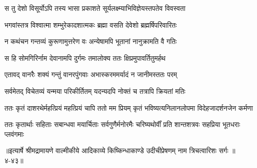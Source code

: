 \twolineshloka
{स तु देशो विसूर्योऽपि तस्य भासा प्रकाशते}
{सूर्यलक्ष्म्याभिविज्ञेयस्तपतेव विवस्वता} %

\twolineshloka
{भगवांस्तत्र विश्वात्मा शम्भुरेकादशात्मकः}
{ब्रह्मा वसति देवेशो ब्रह्मर्षिपरिवारितः} %

\twolineshloka
{न कथंचन गन्तव्यं कुरूणामुत्तरेण वः}
{अन्येषामपि भूतानां नानुक्रामति वै गतिः} %

\twolineshloka
{स हि सोमगिरिर्नाम देवानामपि दुर्गमः}
{तमालोक्य ततः क्षिप्रमुपावर्तितुमर्हथ} %

\twolineshloka
{एतावद् वानरैः शक्यं गन्तुं वानरपुंगवाः}
{अभास्करममर्यादं न जानीमस्ततः परम्} %

\twolineshloka
{सर्वमेतद् विचेतव्यं यन्मया परिकीर्तितम्}
{यदन्यदपि नोक्तं च तत्रापि क्रियतां मतिः} %

\twolineshloka
{ततः कृतं दाशरथेर्महत्प्रियं महत्प्रियं चापि ततो मम प्रियम्}
{कृतं भविष्यत्यनिलानलोपमा विदेहजादर्शनजेन कर्मणा} %

\twolineshloka
{ततः कृतार्थाः सहिताः सबान्धवा मयार्चिताः सर्वगुणैर्मनोरमैः}
{चरिष्यथोर्वीं प्रति शान्तशत्रवः सहप्रिया भूतधराः प्लवंगमाः} %


॥इत्यार्षे श्रीमद्रामायणे वाल्मीकीये आदिकाव्ये किष्किन्धाकाण्डे उदीचीप्रेषणम् नाम त्रिचत्वारिशः सर्गः ॥४-४३॥
